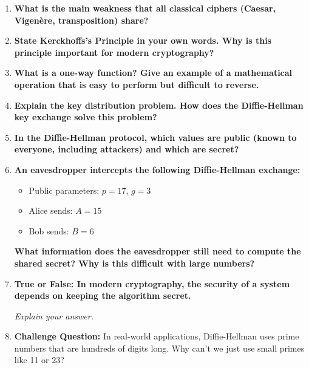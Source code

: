 \documentclass[11pt]{article}
\begin{document}
\begin{enumerate}[label=\textbf{\arabic*.}]
    \item \textbf{What is the main weakness that all classical ciphers (Caesar, Vigenère, transposition) share?}
    
    \vspace{0.3cm}
    
    \item \textbf{State Kerckhoffs's Principle in your own words. Why is this principle important for modern cryptography?}
    
    \vspace{0.3cm}
    
    \item \textbf{What is a one-way function? Give an example of a mathematical operation that is easy to perform but difficult to reverse.}
    
    \vspace{0.3cm}
    
    \item \textbf{Explain the key distribution problem. How does the Diffie-Hellman key exchange solve this problem?}
    
    \vspace{0.3cm}
    
    \item \textbf{In the Diffie-Hellman protocol, which values are public (known to everyone, including attackers) and which are secret?}
    
    \vspace{0.3cm}
    
    \item \textbf{An eavesdropper intercepts the following Diffie-Hellman exchange:}
    \begin{itemize}
        \item Public parameters: $p = 17$, $g = 3$
        \item Alice sends: $A = 15$
        \item Bob sends: $B = 6$
    \end{itemize}
    \textbf{What information does the eavesdropper still need to compute the shared secret? Why is this difficult with large numbers?}
    
    \vspace{0.3cm}
    
    \item \textbf{True or False: In modern cryptography, the security of a system depends on keeping the algorithm secret.}
    
    \textit{Explain your answer.}
    
    \vspace{0.3cm}
    
    \item \textbf{Challenge Question:} In real-world applications, Diffie-Hellman uses prime numbers that are hundreds of digits long. Why can't we just use small primes like 11 or 23?
\end{enumerate}
\end{document}
